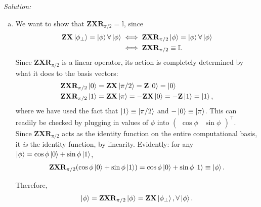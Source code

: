 \documentclass{book}
\theoremstyle{definition}
\newcommand{\nn}{\nonumber}
\newcommand{\X}{\mathbf{X}}
\newcommand{\Id}{\mathbb{I}}
\newcommand{\Z}{\mathbf{Z}}
\begin{document}
\newpage
\noindent \textit{Solution:} 
\begin{enumerate}[(a)]
	\item We want to show that $\Z\X \mathbf{R}_{\pi/2} = \Id$, since 
	\begin{align}
	\Z\X\ket{\phi_\perp} = \ket{\phi} \forall \ket{\phi} &\iff \Z \X \mathbf{R}_{\pi/2}\ket{\phi} = \ket{\phi} \forall \ket{\phi}\nn\\
	&\iff \Z \X \mathbf{R}_{\pi/2} \equiv \Id.
	\end{align}
	Since $\Z \X \mathbf{R}_{\pi/2}$ is a linear operator, its action is completely determined by what it does to the basis vectors:
	\begin{align}
	&\Z \X \mathbf{R}_{\pi/2}\ket{0} = \Z \X \ket{\pi/2} = \Z \ket{0} = \ket{0}\nn\\
	&\Z \X \mathbf{R}_{\pi/2}\ket{1} = \Z \X \ket{\pi} = -\Z \X \ket{0} = -\Z\ket{1} = \ket{1},
	\end{align}
	where we have used the fact that $\ket{1} \equiv \ket{\pi/2}$ and $-\ket{0} \equiv \ket{\pi}$. This can readily be checked by plugging in values of $\phi$ into $\begin{pmatrix}
	\cos \phi & \sin\phi
	\end{pmatrix}^\top$. \\
	
	Since $\Z \X \mathbf{R}_{\pi/2}$ acts as the identity function on the entire computational basis, it \textit{is} the identity function, by linearity. Evidently: for any $\ket{\phi} = \cos\phi \ket{0} + \sin\phi \ket{1}$, 
	\begin{align}
	\Z \X \mathbf{R}_{\pi/2}(\cos\phi \ket{0} + \sin\phi \ket{1}) = \cos\phi \ket{0} + \sin\phi \ket{1} \equiv \ket{\phi}.
	\end{align}
	
	
	
	Therefore,
	\begin{align}
	\ket{\phi} = \Z \X \mathbf{R}_{\pi/2}\ket{\phi} = \Z \X \ket{\phi_\perp}, \forall \ket{\phi}.
	\end{align}
	

\end{enumerate}
\end{document}
